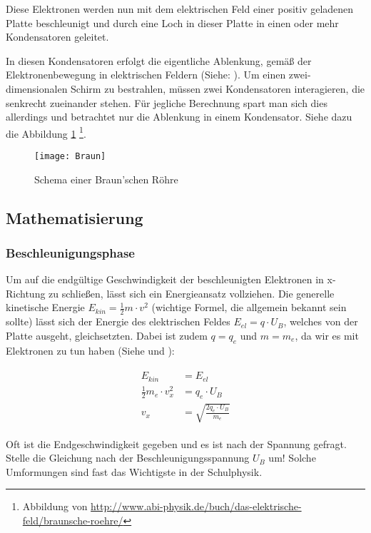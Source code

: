 Diese Elektronen werden nun mit dem elektrischen Feld einer positiv geladenen Platte beschleunigt und durch eine Loch in dieser Platte in einen oder mehr Kondensatoren geleitet.

In diesen Kondensatoren erfolgt die eigentliche Ablenkung, gemäß der Elektronenbewegung in elektrischen Feldern (Siehe: ). Um einen zwei-dimensionalen Schirm zu bestrahlen, müssen zwei Kondensatoren interagieren, die senkrecht zueinander stehen. Für jegliche Berechnung spart man sich dies allerdings und betrachtet nur die Ablenkung in einem Kondensator. Siehe dazu die Abbildung \ref{fig:BraunscheRoehre} \footnote{Abbildung von \url{http://www.abi-physik.de/buch/das-elektrische-feld/braunsche-roehre/}}.

\begin{figure}[h!] 
	\centering
	\texttt{[image: Braun]}
	\caption{Schema einer Braun'schen Röhre}
	\label{fig:BraunscheRoehre}
\end{figure}

\subsection{Mathematisierung}

\subsubsection{Beschleunigungsphase}

Um auf die endgültige Geschwindigkeit der beschleunigten Elektronen in x-Richtung zu schließen, lässt sich ein Energieansatz vollziehen. Die generelle kinetische Energie $E_{kin}=\frac{1}{2}m \cdot v^2$ (wichtige Formel, die allgemein bekannt sein sollte) lässt sich der Energie des elektrischen Feldes $E_{el}=q \cdot U_B$, welches von der Platte ausgeht, gleichsetzten. Dabei ist zudem $q = q_e$ und $m = m_e$, da wir es mit Elektronen zu tun haben (Siehe  und ):

\begin{align} \label{eq:BeschleunigungNachV}
\begin{split}
	E_{kin} &= E_{el} \\
	\frac{1}{2}m_e \cdot v_{x}^2 &= q_e \cdot U_B \\
	v_x &= \sqrt{\frac{2q_e \cdot U_B}{m_e}}
\end{split}
\end{align}

\begin{Aufgabe}
Oft ist die Endgeschwindigkeit gegeben und es ist nach der Spannung gefragt. Stelle die Gleichung nach der Beschleunigungsspannung $U_B$ um! Solche Umformungen sind fast das Wichtigste in der Schulphysik.
\end{Aufgabe}

